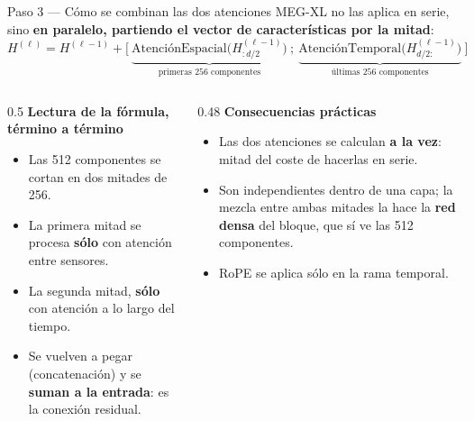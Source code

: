 \documentclass[aspectratio=169,10pt]{beamer}
\newcommand{\term}[1]{\textbf{\color{deepgreen}#1}}
\begin{document}
\begin{frame}[c]{Paso 3 --- Cómo se combinan las dos atenciones}
  \small
  MEG-XL no las aplica en serie, sino \term{en paralelo, partiendo el vector de características por la mitad}:
  \[
    H^{(\ell)} = H^{(\ell-1)} + \Big[\ \underbrace{\text{AtenciónEspacial}\big(H^{(\ell-1)}_{:d/2}\big)}_{\text{primeras 256 componentes}}\ ;\ \underbrace{\text{AtenciónTemporal}\big(H^{(\ell-1)}_{d/2:}\big)}_{\text{últimas 256 componentes}}\ \Big]
  \]
  \vspace{1mm}
  \begin{columns}[t,totalwidth=\linewidth]
    \begin{column}{0.5\linewidth}
      \textbf{Lectura de la fórmula, término a término}
      \begin{itemize}\footnotesize
        \item Las 512 componentes se cortan en dos mitades de 256.
        \item La primera mitad se procesa \term{sólo} con atención entre sensores.
        \item La segunda mitad, \term{sólo} con atención a lo largo del tiempo.
        \item Se vuelven a pegar (concatenación) y se \term{suman a la entrada}: es la conexión residual.
      \end{itemize}
    \end{column}
    \begin{column}{0.48\linewidth}
      \textbf{Consecuencias prácticas}
      \begin{itemize}\footnotesize
        \item Las dos atenciones se calculan \term{a la vez}: mitad del coste de hacerlas en serie.
        \item Son independientes dentro de una capa; la mezcla entre ambas mitades la hace la \term{red densa} del bloque, que sí ve las 512 componentes.
        \item RoPE se aplica sólo en la rama temporal.
      \end{itemize}
    \end{column}
  \end{columns}
\end{frame}
\end{document}
